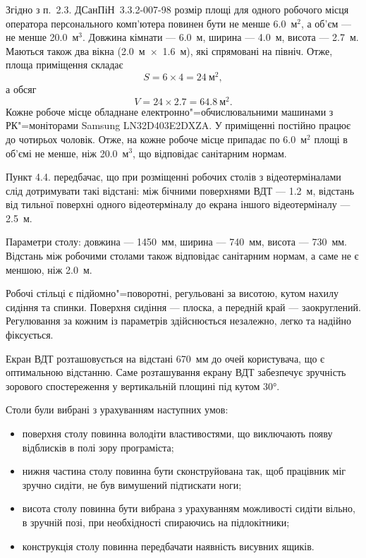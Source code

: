 \documentclass[simple,14pt,utf8,ukrainian]{eskdtext}
\begin{document}
    Згідно з п.~2.3. ДСанПіН~3.3.2-007-98 розмір площі для одного робочого
    місця оператора персонального комп’ютера повинен бути не менше
    \num{6.0}~м$^2$, а об’єм --- не менше \num{20.0}~м$^3$.
    Довжина кімнати --- \num{6.0}~м, ширина --- \num{4.0}~м, висота ---
    \num{2.7}~м.
    Маються також два вікна (\num{2.0}~м~$\times$~\num{1.6}~м), які спрямовані
    на північ.
    Отже, площа приміщення складає
      \[
        S = 6 \times 4 = 24~\text{м}^2,
      \]
    а обсяг
      \[
        V = 24 \times 2.7 = 64.8~\text{м}^2.
      \]
    Кожне робоче місце обладнане електронно"=обчислювальними машинами з
    РК"=моніторами Samsung LN32D403E2DXZA.
    У приміщенні постійно працює до чотирьох чоловік.
    Отже, на кожне робоче місце припадає по \num{6.0}~м$^2$ площі в об’ємі не
    менше, ніж \num{20.0}~м$^3$, що відповідає санітарним нормам.

    Пункт 4.4. передбачає, що при розміщенні робочих столів з відеотерміналами
    слід дотримувати такі відстані: між бічними поверхнями ВДТ ---
    \num{1.2}~м, відстань від тильної поверхні одного відеотерміналу до екрана
    іншого відеотерміналу --- \num{2.5}~м.\cite{dsanpin}

    Параметри столу: довжина --- \num{1450}~мм, ширина --- \num{740}~мм,
    висота --- \num{730}~мм.
    Відстань між робочими столами також відповідає санітарним нормам, а саме
    не є меншою, ніж \num{2.0}~м.

    Робочі стільці є підйомно"=поворотні, регульовані за висотою, кутом нахилу
    сидіння та спинки.
    Поверхня сидіння --- плоска, а передній край --- заокруглений.
    Регулювання за кожним із параметрів здійснюється незалежно, легко та
    надійно фіксується.

    Екран ВДТ розташовується на відстані \num{670}~мм до очей користувача, що
    є оптимальною відстанню.
    Саме розташування екрану ВДТ забезпечує зручність зорового спостереження у
    вертикальній площині під кутом \ang{30}.

    Столи були вибрані з урахуванням наступних умов:
    \begin{itemize}
      \item поверхня столу повинна володіти властивостями, що виключають появу
        відблисків в полі зору програміста;
      \item нижня частина столу повинна бути сконструйована так, щоб працівник
        міг зручно сидіти, не був вимушений підтискати ноги;
      \item висота столу повинна бути вибрана з урахуванням можливості сидіти
        вільно, в зручній позі, при необхідності спираючись на підлокітники;
      \item конструкція столу повинна передбачати наявність висувних ящиків.
    \end{itemize}
\end{document}
